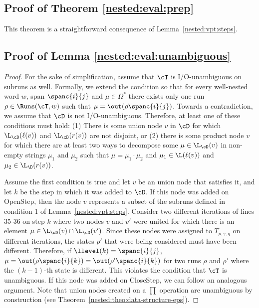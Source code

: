 \subsection{Proof of Theorem \ref{nested:eval:prep}}

This theorem is a straightforward consequence of Lemma~\ref{nested:vpt:steps}.

\subsection{Proof of Lemma \ref{nested:eval:unambiguous}}

\begin{proof}
	For the sake of simplification, assume that $\cT$ is I/O-unambiguous on subruns as well. Formally, we extend the condition so that for every well-nested word $w$, span $\spanc{i}{j}$ and $\mu\in\Omega^*$ there exists only one run $\rho\in\Runs(\cT,w)$ such that $\mu = \out(\rho\spanc{i}{j})$.
	Towards a contradiction, we assume that $\cD$ is not I/O-unambiguous. Therefore, at least one of these conditions must hold: (1) There is some union node $v$ in $\cD$ for which $\L_{\cD}(\ell(v))$ and $\L_{\cD}(r(v))$ are not disjoint, or (2) there is some product node $v$ for which there are at least two ways to decompose some $\mu\in\L_{\cD}(v)$ in non-empty strings $\mu_1$ and $\mu_2$ such that $\mu = \mu_1\cdot\mu_2$ and $\mu_1\in\L(\ell(v))$ and $\mu_2\in\L_{\D}(r(v))$. 
	
	Assume the first condition is true and let $v$ be an union node that satisfies it, and let $k$ be the step in which it was added to $\cD$. If this node was added on {\sc OpenStep}, then the node $v$ represents a subset of the subruns defined in condition 1 of Lemma~\ref{nested:vpt:steps}. Consider two different iterations of lines 35-36 on step $k$ where two nodes $v$ and $v'$ were united for which there is an element $\mu\in\L_{\cD}(v)\cap\L_{\cD}(v')$. Since these nodes were assigned to $T_{p,\gamma,q}$ on different iterations, the states $p'$ that were being considered must have been different. Therefore, if $\llevel(k) = \spanc{i}{j}$, $\mu = \out(\rho\spanc{i}{k}) = \out(\rho'\spanc{i}{k})$ for two runs $\rho$ and $\rho'$ where the $(k-1)$-th state is different. This violates the condition that $\cT$ is unambiguous. If this node was added on {\sc CloseStep}, we can follow an analogous argument. Note that union nodes created on a $\prod$ operation are unambiguous by construction (see Theorem~\ref{nested:theo:data-structure-eps}).
	

\end{proof}
